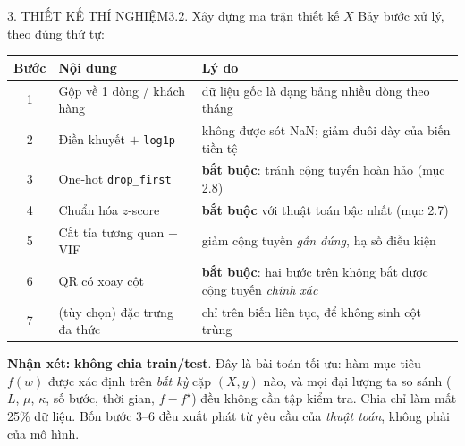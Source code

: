 \documentclass[aspectratio=169,11pt]{beamer}
\newcommand{\nx}{\textbf{Nhận xét:}}
\begin{document}
\begin{frame}{3. THIẾT KẾ THÍ NGHIỆM}{3.2. Xây dựng ma trận thiết kế $X$}
  \footnotesize
  Bảy bước xử lý, theo đúng thứ tự:
  \begin{center}\scriptsize
  \begin{tabular}{clp{6.6cm}}
    \toprule
    Bước & Nội dung & Lý do\\
    \midrule
    1 & Gộp về 1 dòng / khách hàng & dữ liệu gốc là dạng bảng nhiều dòng theo tháng\\
    2 & Điền khuyết $+$ \texttt{log1p} & không được sót NaN; giảm đuôi dày của biến tiền tệ\\
    3 & One-hot \texttt{drop\_first} & \textbf{bắt buộc}: tránh cộng tuyến hoàn hảo (mục 2.8)\\
    4 & Chuẩn hóa $z$-score & \textbf{bắt buộc} với thuật toán bậc nhất (mục 2.7)\\
    5 & Cắt tỉa tương quan $+$ VIF & giảm cộng tuyến \emph{gần đúng}, hạ số điều kiện\\
    6 & QR có xoay cột & \textbf{bắt buộc}: hai bước trên không bắt được cộng tuyến \emph{chính xác}\\
    7 & (tùy chọn) đặc trưng đa thức & chỉ trên biến liên tục, để không sinh cột trùng\\
    \bottomrule
  \end{tabular}
  \end{center}
  \vspace{4pt}
  \nx{} \textbf{không chia train/test}. Đây là bài toán tối ưu: hàm mục tiêu $f(w)$ được xác định
  trên \emph{bất kỳ} cặp $(X,y)$ nào, và mọi đại lượng ta so sánh ($L$, $\mu$, $\kappa$, số bước,
  thời gian, $f-f^\star$) đều không cần tập kiểm tra. Chia chỉ làm mất 25\% dữ liệu.
  Bốn bước 3--6 đều xuất phát từ yêu cầu của \emph{thuật toán}, không phải của mô hình.
\end{frame}
\end{document}
